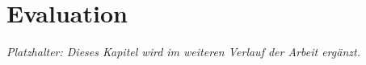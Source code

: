
\chapter{Evaluation}\label{evaluation}

\textit{Platzhalter: Dieses Kapitel wird im weiteren Verlauf der Arbeit
ergänzt.}
